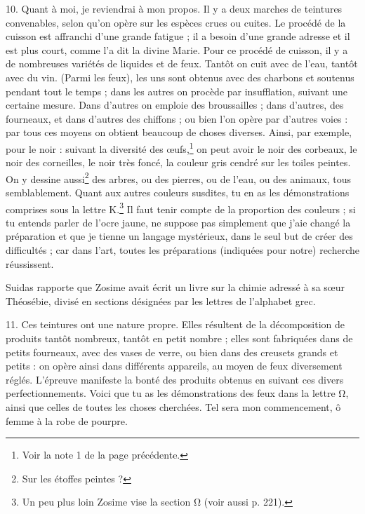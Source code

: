 \documentclass[landscape, a4paper, 11pt, oneside, polutonikogreek, french]{article}
\begin{document}
10. Quant à moi, je reviendrai à mon propos. Il y a deux marches de teintures convenables, selon qu'on opère sur les espèces crues ou cuites. Le procédé de la cuisson est affranchi d'une grande fatigue ; il a besoin d'une grande adresse et il est plus court, comme l'a dit la divine Marie. Pour ce procédé de cuisson, il y a de nombreuses variétés de liquides et de feux. Tantôt on cuit avec de l'eau, tantôt avec du vin. (Parmi les feux), les uns sont obtenus avec des charbons et soutenus pendant tout le temps ; dans les autres on procède par insufflation, suivant une certaine mesure. Dans d'autres on emploie des broussailles ; dans d'autres, des fourneaux, et dans d'autres des chiffons ; ou bien l'on opère par d'autres voies : par tous ces moyens on obtient beaucoup de choses diverses. Ainsi, par exemple, pour le noir : suivant la diversité des œufs,\footnote{Voir la note 1 de la page précédente.} on peut avoir le noir des corbeaux, le noir des corneilles, le noir très foncé, la couleur gris cendré sur les toiles peintes. On y dessine aussi\footnote{Sur les étoffes peintes ?} des arbres, ou des pierres, ou de l'eau, ou des animaux, tous semblablement. Quant aux autres couleurs susdites, tu en as les démonstrations comprises sous la lettre K.\footnote{Un peu plus loin Zosime vise la section Ω (voir aussi p. 221).  } Il faut tenir compte de la proportion des couleurs ; si tu entends parler de l'ocre jaune, ne suppose pas simplement que j'aie changé la préparation et que je tienne un langage mystérieux, dans le seul but de créer des difficultés ; car dans l'art, toutes les préparations (indiquées pour notre) recherche réussissent.

Suidas rapporte que Zosime avait écrit un livre sur la chimie adressé à sa sœur Théosébie, divisé en sections désignées par les lettres de l'alphabet grec.

11. Ces teintures ont une nature propre. Elles résultent de la décomposition de produits tantôt nombreux, tantôt en petit nombre ; elles sont fabriquées dans de petits fourneaux, avec des vases de verre, ou bien dans des creusets grands et petits : on opère ainsi dans différents appareils, au moyen de feux diversement réglés. L'épreuve manifeste la bonté des produits obtenus en suivant ces divers perfectionnements. Voici que tu as les démonstrations des feux dans la lettre Ω, ainsi que celles de toutes les choses cherchées. Tel sera mon commencement, ô femme à la robe de pourpre.

\bigskip
\centerline{\EightStarTaper}
\centerline{\EightStarTaper\EightStarTaper}
\bigskip
\end{document}
